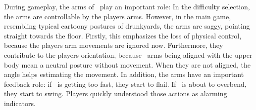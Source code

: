 During gameplay, the arms of \ed\ play an important role: In the difficulty selection, the arms are controllable by the players arms. However, in the main game, resembling typical cartoony postures of drunkyards, the arms are saggy, pointing straight towards the floor. Firstly, this emphasizes the loss of physical control, because the players arm movements are ignored now. Furthermore, they contribute to the players orientation, because \eds\ arms being aligned with the upper body mean a neutral posture without movement. When they are not aligned, the angle helps estimating the movement. In addition, the arms have an important feedback role: if \ed\ is getting too fast, they start to flail. If \ed\ is about to overbend, they start to swing. Players quickly understood those actions as alarming indicators.